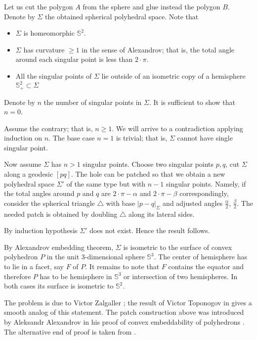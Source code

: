 Let us cut the polygon $A$ from the sphere and glue instead the polygon $B$.
Denote by $\Sigma$ the obtained spherical polyhedral space.
Note that 
\begin{itemize}
\item $\Sigma$ is homeomorphic $\mathbb S^2$.
\item $\Sigma$ has curvature $\ge 1$ in the sense of Alexandrov; that is, the total angle around each singular point is less than $2\cdot \pi$.
\item All the singular points of $\Sigma$ 
lie outside of an isometric copy of a hemisphere $\mathbb{S}^2_+\subset \Sigma$
\end{itemize}

Denote by $n$ the number of singular points in $\Sigma$.
It is sufficient to show that $n=0$.

Assume the contrary; that is, $n\ge 1$.
We will arrive to a contradiction applying induction on $n$.
The base case $n=1$ is trivial; 
that is, $\Sigma$ cannot have single singular point.

Now assume $\Sigma$ has $n>1$ singular points.
Choose two singular points $p, q$,
cut $\Sigma$ along a geodesic $[pq]$.
The hole can be patched so that we obtain a new polyhedral space $\Sigma'$ of the same type but with $n-1$ singular points.
Namely, if the total angles around $p$ and $q$ are $2\cdot \pi-\alpha$ and $2\cdot \pi-\beta$ correspondingly,
consider the spherical triangle $\triangle$ with base $|p-q|_\Sigma$ and adjusted angles $\tfrac\alpha2$, $\tfrac\beta2$. 
The needed patch is obtained by doubling $\triangle$ along its lateral sides.


By induction hypothesis $\Sigma'$ does not exist. 
Hence the result follows.
\qeds

By Alexandrov embedding theorem, $\Sigma$ is isometric to the surface of convex polyhedron $P$ in the unit 3-dimensional sphere $\mathbb S^3$. 
The center of hemisphere has to lie in a facet, say $F$ of $P$.
It remains to note that $F$ contains the equator and therefore $P$ has to be hemisphere in $\mathbb S^3$ or intersection of two hemispheres.
In both cases its surface is isometric to $\mathbb S^2$.
\qeds

The problem is due to Victor Zalgaller \cite[see][]{zalgaller-shperical-polygon};
the result of Victor Toponogov in \cite{toponogov} gives a smooth analog of this statement.
The patch construction above was introduced by 
Aleksandr Alexandrov
in his proof of convex embeddability of polyhedrons
\cite[see][VI, \S7]{alexandrov1948}.
The alternative end of proof is taken from \cite{panov-petrunin}.



